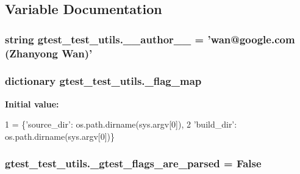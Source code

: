 \subsection{Variable Documentation}
\hypertarget{namespacegtest__test__utils_a221c8f3baa0a26c6158106b76d51e9ce}{
\subsubsection[{\-\_\-\-\_\-author\-\_\-\-\_\-}]{\setlength{\rightskip}{0pt plus 5cm}string gtest\-\_\-test\-\_\-utils.\-\_\-\-\_\-author\-\_\-\-\_\- = 'wan@google.\-com (Zhanyong Wan)'}}\label{namespacegtest__test__utils_a221c8f3baa0a26c6158106b76d51e9ce}
\hypertarget{namespacegtest__test__utils_a2493ee5c4436cfb8b6746e3da0a5d9a1}{
\subsubsection[{\-\_\-flag\-\_\-map}]{\setlength{\rightskip}{0pt plus 5cm}dictionary gtest\-\_\-test\-\_\-utils.\-\_\-flag\-\_\-map}}\label{namespacegtest__test__utils_a2493ee5c4436cfb8b6746e3da0a5d9a1}
{\bfseries Initial value\-:}
\begin{DoxyCode}
1 = \{\textcolor{stringliteral}{'source\_dir'}: os.path.dirname(sys.argv[0]),
2              \textcolor{stringliteral}{'build\_dir'}: os.path.dirname(sys.argv[0])\}
\end{DoxyCode}
\hypertarget{namespacegtest__test__utils_a123ea2b70f6aaf7849d58e68b87a8131}{
\subsubsection[{\-\_\-gtest\-\_\-flags\-\_\-are\-\_\-parsed}]{\setlength{\rightskip}{0pt plus 5cm}gtest\-\_\-test\-\_\-utils.\-\_\-gtest\-\_\-flags\-\_\-are\-\_\-parsed = False}}\label{namespacegtest__test__utils_a123ea2b70f6aaf7849d58e68b87a8131}
